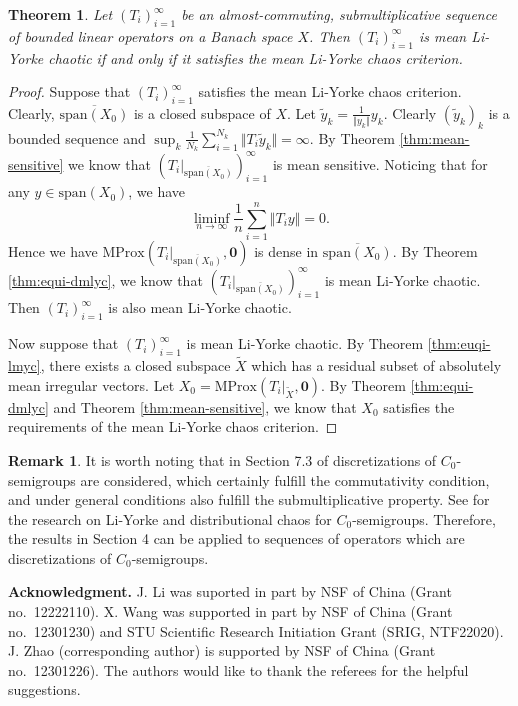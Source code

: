 \documentclass[12pt,a4paper]{amsart}
\theoremstyle{definition}
\newtheorem{rem}[defn]{Remark}
\theoremstyle{plain}
\newtheorem{thm}[defn]{Theorem}
\begin{document}
\begin{thm}
    Let $(T_i)_{i=1}^{\infty}$ be an almost-commuting, submultiplicative sequence of bounded linear operators on a Banach space $X$.
    Then $(T_i)_{i=1}^\infty$ is mean Li-Yorke chaotic if and only if it satisfies the mean Li-Yorke chaos criterion.
\end{thm}
\begin{proof}
    Suppose that $(T_i)_{i=1}^\infty$ satisfies the mean Li-Yorke chaos criterion. Clearly, $\overline{\mathrm{span}(X_0)}$ is a closed subspace of $X$. Let $\tilde{y}_k=\frac{1}{\Vert y_k\Vert}y_k$. Clearly $(\tilde{y}_k)_k$ is a bounded sequence and $\sup_k\frac{1}{N_k}\sum_{i=1}^{N_k}\Vert T_i\tilde{y}_k\Vert=\infty$. By Theorem \ref{thm:mean-sensitive} we know that $\left(T_i|_{\overline{\mathrm{span}(X_0)}}\right)_{i=1}^\infty$ is mean sensitive. Noticing that for any $y\in\mathrm{span}(X_0)$, we have
    \[
        \liminf_{n\to\infty}\frac{1}{n}\sum_{i=1}^n\Vert T_iy\Vert=0.
    \]
    Hence we have $\mathrm{MProx}\left( T_i|_{\overline{\mathrm{span}(X_0)}},\mathbf{0}\right)$ is dense in $\overline{\mathrm{span}(X_0)}$.
    By Theorem \ref{thm:equi-dmlyc}, we know that $\left(T_i|_{\overline{\mathrm{span}(X_0)}}\right)_{i=1}^\infty$  is mean Li-Yorke chaotic. Then $(T_i)_{i=1}^\infty$ is also mean Li-Yorke chaotic.

    Now suppose that $(T_i)_{i=1}^\infty$ is mean Li-Yorke chaotic. By Theorem \ref{thm:euqi-lmyc}, there exists a closed subspace $\widetilde{X}$ which has a residual subset of absolutely mean irregular vectors. Let $X_0=\mathrm{MProx}(T_i|_{\widetilde{X}},\mathbf{0})$. By Theorem \ref{thm:equi-dmlyc} and Theorem \ref{thm:mean-sensitive}, we know that $X_0$ satisfies the requirements of the mean Li-Yorke chaos criterion.
\end{proof}

\begin{rem}
    It is worth noting that in Section 7.3 of \cite{GP2011} discretizations of $C_0$-semigroups are considered, which certainly fulfill the commutativity condition, and under general conditions also fulfill the submultiplicative property. 
    See \cites{ABMP2013, CKMM2016, Wu2014, ZY2023} for the research on Li-Yorke and distributional chaos for $C_0$-semigroups.
    Therefore, the results in Section 4 can be applied to sequences of operators which are discretizations of $C_0$-semigroups. 
\end{rem}

\medskip 

\noindent \textbf{Acknowledgment.}
J. Li was suported in part by NSF of China (Grant no.~12222110).
X. Wang was supported in part by NSF of China (Grant no.~12301230) and STU Scientific Research Initiation Grant (SRIG, NTF22020).
J. Zhao (corresponding author) is supported by NSF of China (Grant no.~12301226).
The authors  would like to thank the referees for the helpful suggestions.
\end{document}
